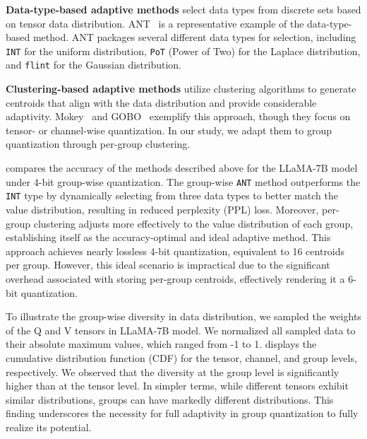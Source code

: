 \textbf{Data-type-based adaptive methods} select data types from discrete sets based on tensor data distribution.
ANT~\cite{guo2022ant} is a representative example of the data-type-based method.
ANT packages several different data types for selection, including \texttt{INT} for the uniform distribution, \texttt{PoT} (Power of Two) for the Laplace distribution, and \texttt{flint} for the Gaussian distribution.

\textbf{Clustering-based adaptive methods} utilize clustering algorithms to generate centroids that align with the data distribution and provide considerable adaptivity. 
Mokey~\cite{zadeh2022mokey} and GOBO~\cite{zadeh2020gobo} exemplify this approach, though they focus on tensor- or channel-wise quantization. In our study, we adapt them to group quantization through per-group clustering.

 compares the accuracy of the methods described above for the LLaMA-7B model under 4-bit group-wise quantization. 
The group-wise \texttt{ANT} method outperforms the \texttt{INT} type by dynamically selecting from three data types to better match the value distribution, resulting in reduced perplexity (PPL) loss. 
Moreover, per-group clustering adjusts more effectively to the value distribution of each group, establishing itself as the accuracy-optimal and ideal adaptive method. 
This approach achieves nearly lossless 4-bit quantization, equivalent to 16 centroids per group. 
However, this ideal scenario is impractical due to the significant overhead associated with storing per-group centroids, effectively rendering it a 6-bit quantization.



To illustrate the group-wise diversity in data distribution, we sampled the weights of the Q and V tensors in LLaMA-7B model. 
We normalized all sampled data to their absolute maximum values, which ranged from -1 to 1.  displays the cumulative distribution function (CDF) for the tensor, channel, and group levels, respectively. 
We observed that the diversity at the group level is significantly higher than at the tensor level. 
In simpler terms, while different tensors exhibit similar distributions, groups can have markedly different distributions. This finding underscores the necessity for full adaptivity in group quantization to fully realize its potential.
